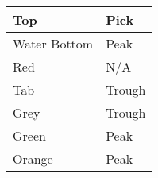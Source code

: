 \begin{tabular}{l l}
    \toprule
    Top & Pick \\
    
    \midrule
    Water Bottom & Peak \\
    Red & N/A \\
    Tab & Trough \\
    Grey & Trough \\
    Green & Peak \\
    Orange & Peak \\
    \bottomrule
\end{tabular}